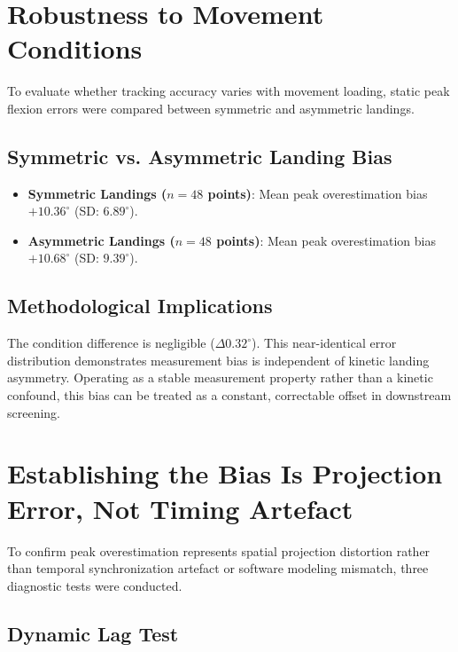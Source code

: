 \section{Robustness to Movement Conditions}
\label{sec:6-4-robustness-to-movement-conditions}


To evaluate whether tracking accuracy varies with movement loading, static peak flexion errors were compared between symmetric and asymmetric landings.

\subsection{Symmetric vs. Asymmetric Landing Bias}
\label{sec:6-4-1-symmetric-vs-asymmetric-landing-bias}

\begin{itemize}
  \item \textbf{Symmetric Landings ($n = 48$ points)}: Mean peak overestimation bias \textbf{$+10.36^\circ$} (SD: $6.89^\circ$).
  \item \textbf{Asymmetric Landings ($n = 48$ points)}: Mean peak overestimation bias \textbf{$+10.68^\circ$} (SD: $9.39^\circ$).
\end{itemize}

\subsection{Methodological Implications}
\label{sec:6-4-2-methodological-implications}

The condition difference is negligible ($\Delta 0.32^\circ$). This near-identical error distribution demonstrates measurement bias is independent of kinetic landing asymmetry. Operating as a stable measurement property rather than a kinetic confound, this bias can be treated as a constant, correctable offset in downstream screening.



\section{Establishing the Bias Is Projection Error, Not Timing Artefact}
\label{sec:6-5-establishing-the-bias-is-projection-error-not-timing-artefact}


To confirm peak overestimation represents spatial projection distortion rather than temporal synchronization artefact or software modeling mismatch, three diagnostic tests were conducted.

\subsection{Dynamic Lag Test}
\label{sec:6-5-1-dynamic-lag-test}

